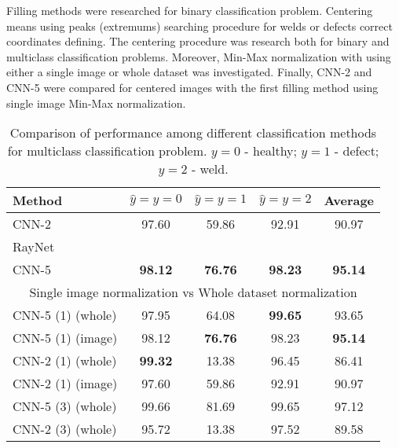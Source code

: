 Filling methods were researched for binary classification problem.
Centering means using peaks (extremums) searching procedure for welds or defects correct coordinates defining.
The centering procedure was research both for binary and multiclass classification problems.
Moreover, Min-Max normalization with using either a single image or whole dataset was investigated.
Finally, CNN-2 and CNN-5 were compared for centered images with the first filling method using single image Min-Max normalization.

\begin{table}[!htb]
	\caption{\label{tab:comp2}Comparison of performance among different classification methods for multiclass classification problem. $y=0$ - healthy; $y=1$ - defect; $y=2$ - weld.}
	\begin{center}
		\small
		\begin{tabular}{| l | c | c | c | c |}
			\hline
			Method & $\hat{y}=y=0$ & $\hat{y}=y=1$ & $\hat{y}=y=2$ & Average \\
			\hline
			CNN-2 & 97.60 & 59.86 & 92.91 & 90.97 \\
			RayNet &  &  &  &  \\
			CNN-5 & \textbf{98.12} & \textbf{76.76} & \textbf{98.23} & \textbf{95.14} \\
			\hline
			\multicolumn{5}{|c|}{Single image normalization vs Whole dataset normalization}  \\
			\hline
			CNN-5 (1) (whole) & 97.95 & 64.08 & \textbf{99.65} & 93.65 \\
			CNN-5 (1) (image) &  98.12 & \textbf{76.76} & 98.23 & \textbf{95.14} \\
			CNN-2 (1) (whole) & \textbf{99.32} & 13.38 & 96.45 & 86.41 \\
			CNN-2 (1) (image) & 97.60 & 59.86 & 92.91 & 90.97 \\
			CNN-5 (3) (whole) & 99.66 & 81.69 & 99.65 & 97.12 \\
			CNN-2 (3) (whole) & 95.72 & 13.38 & 97.52 & 89.58 \\
			\hline
		\end{tabular}
	\end{center}
\end{table}
